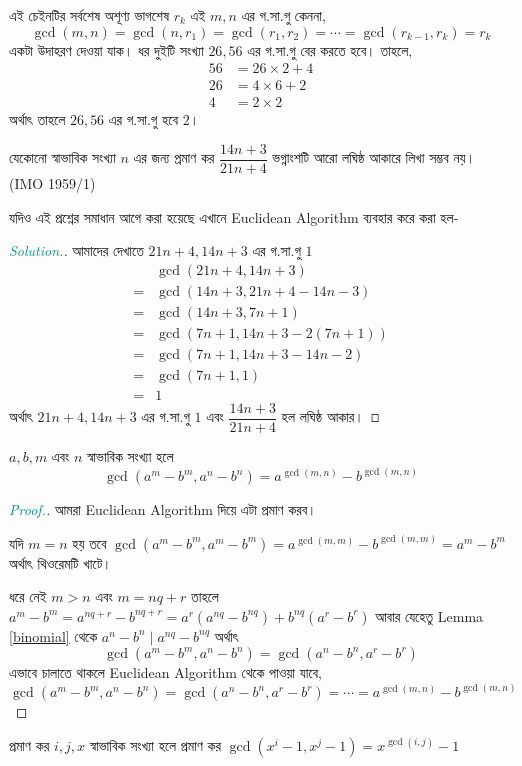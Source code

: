 \documentclass[a4paper,11pt]{article}
\newenvironment{sltn}{\begin{proof}[\emph{\textcolor{darkcyan}{Solution.}}]} {\end{proof}}
\newenvironment{prf}{\begin{proof}[\emph{\textcolor{darkcyan}{Proof.}}]} {\end{proof}}
\begin{document}
এই চেইনটির সর্বশেষ অশূণ্য ভাগশেষ $r_k$ এই $m,n$ এর গ.সা.গু কেননা, 
\[\gcd(m,n)=\gcd(n,r_1)=\gcd(r_1,r_2)=\cdots = \gcd(r_{k-1},r_k)=r_k\]
একটা উদাহরণ দেওয়া যাক। ধর দুইটি সংখ্যা $26,56$ এর গ.সা.গু বের করতে হবে। তাহলে, 
\begin{align*}
	56 & =26\times 2+4 \\
	26 & =4\times 6+2  \\
	4  & =2\times 2
\end{align*}
অর্থাৎ তাহলে $26,56$ এর গ.সা.গু হবে $2$। 
\begin{xmpl}
	যেকোনো স্বাভাবিক সংখ্যা $n$ এর জন্য প্রমাণ কর $\dfrac{14n+3}{21n+4}$ ভগ্নাংশটি আরো লঘিষ্ঠ আকারে লিখা সম্ভব নয়। (IMO 1959/1)
\end{xmpl}
যদিও এই প্রশ্নের সমাধান আগে করা হয়েছে এখানে Euclidean Algorithm ব্যবহার করে করা হল- 
\begin{sltn}
	আমাদের দেখাতে $21n+4,14n+3$ এর গ.সা.গু $1$
	\begin{align*}
		  & \gcd(21n+4,14n+3)        \\
		= & \gcd(14n+3,21n+4-14n-3)  \\
		= & \gcd(14n+3,7n+1)         \\
		= & \gcd(7n+1,14n+3-2(7n+1)) \\
		= & \gcd(7n+1,14n+3-14n-2)   \\
		= & \gcd(7n+1,1)             \\
		= & 1
	\end{align*}
	অর্থাৎ $21n+4,14n+3$ এর গ.সা.গু $1$ এবং $\dfrac{14n+3}{21n+4}$ হল লঘিষ্ঠ আকার। 
\end{sltn}
\begin{thrm}
	\label{eugcd}
	$a,b,m$ এবং $n$ স্বাভাবিক সংখ্যা হলে 
	\[\gcd(a^m-b^m,a^n-b^n)=a^{\gcd(m,n)}-b^{\gcd(m,n)}\]
\end{thrm}
\begin{prf}
	আমরা Euclidean Algorithm দিয়ে এটা প্রমাণ করব। 
	
	যদি $m=n$ হয় তবে $\gcd(a^m-b^m,a^m-b^m)=a^{\gcd(m,m)}-b^{\gcd(m,m)}=a^m-b^m$ অর্থাৎ থিওরেমটি খাটে। 
	
	ধরে নেই $m >n$ এবং $m=nq+r$ তাহলে $a^m-b^m=a^{nq+r}-b^{nq+r}=a^r(a^{nq}-b^{nq})+b^{nq}(a^r-b^r)$ আবার যেহেতু Lemma \ref{binomial} থেকে $a^n-b^n \mid a^{nq}-b^{nq}$ অর্থাৎ 
	\[\gcd(a^m-b^m,a^n-b^n)=\gcd(a^n-b^n,a^r-b^r)\]
	এভাবে চালাতে থাকলে Euclidean Algorithm থেকে পাওয়া যাবে, 
	\[\gcd(a^m-b^m,a^n-b^n)=\gcd(a^n-b^n,a^r-b^r)=\cdots=a^{\gcd(m,n)}-b^{\gcd(m,n)}\]
\end{prf}
\begin{xmpl}
	প্রমাণ কর $i,j,x$ স্বাভাবিক সংখ্যা হলে প্রমাণ কর $\gcd(x^i-1,x^j-1)=x^{\gcd(i,j)}-1$
\end{xmpl}
\end{document}

